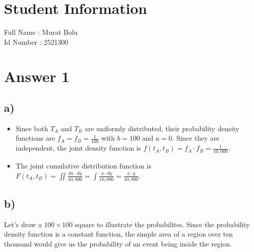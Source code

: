 \documentclass[12pt]{article}
\begin{document}
\section*{Student Information }
Full Name : Murat Bolu \\
Id Number : 2521300 \\

\section*{Answer 1}

\subsection*{a)}

\begin{itemize}
  \item Since both $T_A$ and $T_B$ are uniformly distributed, their probability
  density functions are $f_A = f_B = \frac{1}{100}$ with $b = 100$ and $a = 0$.
  Since they are independent, the joint density function is $f(t_A, t_B) = f_A
  \cdot f_B = \frac{1}{10,000}$.
  \item The joint cumulative distribution function is $F(t_A, t_B) = \iint
  \frac{dx \cdot dy}{10,000} = \int \frac{x \cdot dy}{10,000} = \frac{x \cdot
  y}{10,000}$.
\end{itemize}

\subsection*{b)}

Let's draw a $100 \times 100$ square to illustrate the probabilites. Since the
probability density function is a constant function, the simple area of a region
over ten thousand would give us the probability of an event being inside the
region.

\begin{center}
\end{center}
\end{document}

